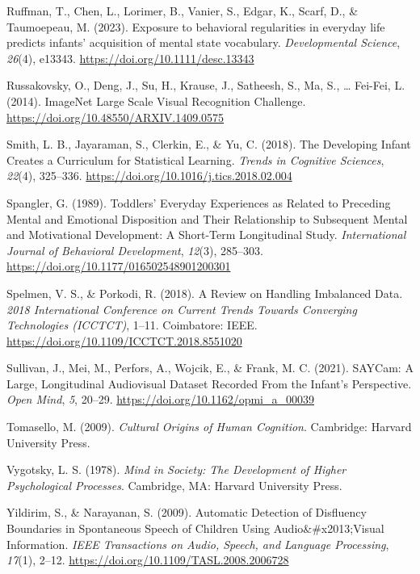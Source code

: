\documentclass[
  man,floatsintext]{apa6}
\newlength{\cslhangindent}
\newenvironment{CSLReferences}[2] %
 {\begin{list}{}{%
  \setlength{\itemindent}{0pt}
  \setlength{\leftmargin}{0pt}
  \setlength{\parsep}{0pt}
  \ifodd #1
   \setlength{\leftmargin}{\cslhangindent}
   \setlength{\itemindent}{-1\cslhangindent}
  \fi
  \setlength{\itemsep}{#2\baselineskip}}}
 {\end{list}}
\begin{document}
\begin{CSLReferences}{1}{0}
Ruffman, T., Chen, L., Lorimer, B., Vanier, S., Edgar, K., Scarf, D., \& Taumoepeau, M. (2023). Exposure to behavioral regularities in everyday life predicts infants' acquisition of mental state vocabulary. \emph{Developmental Science}, \emph{26}(4), e13343. \url{https://doi.org/10.1111/desc.13343}

Russakovsky, O., Deng, J., Su, H., Krause, J., Satheesh, S., Ma, S., \ldots{} Fei-Fei, L. (2014). {ImageNet Large Scale Visual Recognition Challenge}. \url{https://doi.org/10.48550/ARXIV.1409.0575}

Smith, L. B., Jayaraman, S., Clerkin, E., \& Yu, C. (2018). The {Developing Infant Creates} a {Curriculum} for {Statistical Learning}. \emph{Trends in Cognitive Sciences}, \emph{22}(4), 325--336. \url{https://doi.org/10.1016/j.tics.2018.02.004}

Spangler, G. (1989). Toddlers' {Everyday Experiences} as {Related} to {Preceding Mental} and {Emotional Disposition} and {Their Relationship} to {Subsequent Mental} and {Motivational Development}: {A Short-Term Longitudinal Study}. \emph{International Journal of Behavioral Development}, \emph{12}(3), 285--303. \url{https://doi.org/10.1177/016502548901200301}

Spelmen, V. S., \& Porkodi, R. (2018). A {Review} on {Handling Imbalanced Data}. \emph{2018 {International Conference} on {Current Trends} Towards {Converging Technologies} ({ICCTCT})}, 1--11. Coimbatore: IEEE. \url{https://doi.org/10.1109/ICCTCT.2018.8551020}

Sullivan, J., Mei, M., Perfors, A., Wojcik, E., \& Frank, M. C. (2021). {SAYCam}: {A Large}, {Longitudinal Audiovisual Dataset Recorded From} the {Infant}'s {Perspective}. \emph{Open Mind}, \emph{5}, 20--29. \url{https://doi.org/10.1162/opmi_a_00039}

Tomasello, M. (2009). \emph{Cultural {Origins} of {Human Cognition}}. Cambridge: Harvard University Press.

Vygotsky, L. S. (1978). \emph{Mind in {Society}: {The Development} of {Higher Psychological Processes}}. Cambridge, MA: Harvard University Press.

Yildirim, S., \& Narayanan, S. (2009). Automatic {Detection} of {Disfluency Boundaries} in {Spontaneous Speech} of {Children Using Audio}\&\#x2013;{Visual Information}. \emph{IEEE Transactions on Audio, Speech, and Language Processing}, \emph{17}(1), 2--12. \url{https://doi.org/10.1109/TASL.2008.2006728}

\end{CSLReferences}
\end{document}
